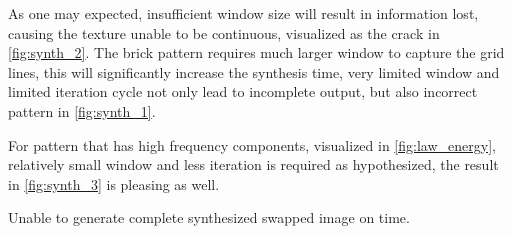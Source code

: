 \documentclass[12pt]{article}
\begin{document}
As one may expected, insufficient window size will result in information lost, causing the texture unable to be continuous, visualized as the crack in \autoref{fig:synth_2}.
The brick pattern requires much larger window to capture the grid lines, this will significantly increase the synthesis time, very limited window and limited iteration cycle not only lead to incomplete output, but also incorrect pattern in \autoref{fig:synth_1}. 

For pattern that has high frequency components, visualized in \autoref{fig:law_energy}, relatively small window and less iteration is required as hypothesized, the result in \autoref{fig:synth_3} is pleasing as well.


Unable to generate complete synthesized swapped image on time.
\end{document}
